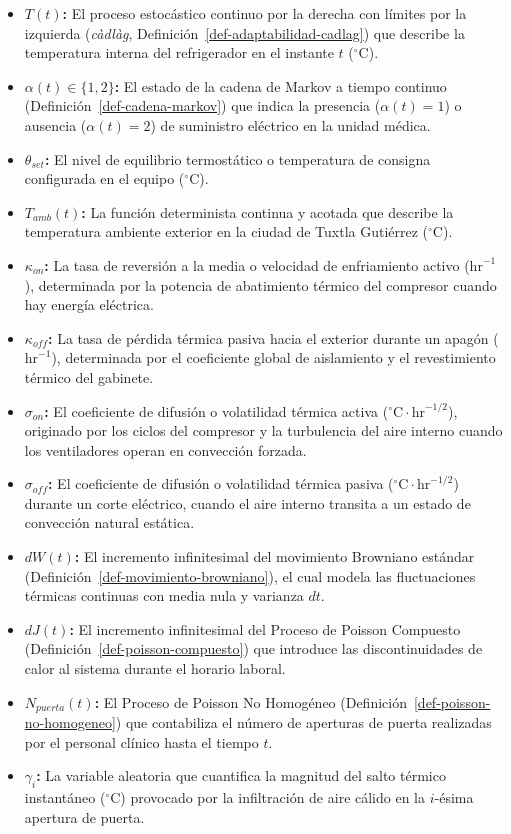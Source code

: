 \documentclass[
  spanish,
  us-letterpaper,
]{scrreprt}
\providecommand{\tightlist}{%
  \setlength{\itemsep}{0pt}\setlength{\parskip}{0pt}}
\numberwithin{equation}{section}
\theoremstyle{plain}
\theoremstyle{plain}
\theoremstyle{plain}
\theoremstyle{definition}
\theoremstyle{remark}
\begin{document}
\begin{itemize}
\tightlist
\item
  \textbf{\(T(t)\):} El proceso estocástico continuo por la derecha con
  límites por la izquierda (\emph{càdlàg},
  Definición~\ref{def-adaptabilidad-cadlag}) que describe la temperatura
  interna del refrigerador en el instante \(t\) (\(^\circ\text{C}\)).
\item
  \textbf{\(\alpha(t) \in \{1, 2\}\):} El estado de la cadena de Markov
  a tiempo continuo (Definición~\ref{def-cadena-markov}) que indica la
  presencia (\(\alpha(t)=1\)) o ausencia (\(\alpha(t)=2\)) de suministro
  eléctrico en la unidad médica.
\item
  \textbf{\(\theta_{set}\):} El nivel de equilibrio termostático o
  temperatura de consigna configurada en el equipo (\(^\circ\text{C}\)).
\item
  \textbf{\(T_{amb}(t)\):} La función determinista continua y acotada
  que describe la temperatura ambiente exterior en la ciudad de Tuxtla
  Gutiérrez (\(^\circ\text{C}\)).
\item
  \textbf{\(\kappa_{on}\):} La tasa de reversión a la media o velocidad
  de enfriamiento activo (\(\text{hr}^{-1}\)), determinada por la
  potencia de abatimiento térmico del compresor cuando hay energía
  eléctrica.
\item
  \textbf{\(\kappa_{off}\):} La tasa de pérdida térmica pasiva hacia el
  exterior durante un apagón (\(\text{hr}^{-1}\)), determinada por el
  coeficiente global de aislamiento y el revestimiento térmico del
  gabinete.
\item
  \textbf{\(\sigma_{on}\):} El coeficiente de difusión o volatilidad
  térmica activa (\(^\circ\text{C}\cdot\text{hr}^{-1/2}\)), originado
  por los ciclos del compresor y la turbulencia del aire interno cuando
  los ventiladores operan en convección forzada.
\item
  \textbf{\(\sigma_{off}\):} El coeficiente de difusión o volatilidad
  térmica pasiva (\(^\circ\text{C}\cdot\text{hr}^{-1/2}\)) durante un
  corte eléctrico, cuando el aire interno transita a un estado de
  convección natural estática.
\item
  \textbf{\(dW(t)\):} El incremento infinitesimal del movimiento
  Browniano estándar (Definición~\ref{def-movimiento-browniano}), el
  cual modela las fluctuaciones térmicas continuas con media nula y
  varianza \(dt\).
\item
  \textbf{\(dJ(t)\):} El incremento infinitesimal del Proceso de Poisson
  Compuesto (Definición~\ref{def-poisson-compuesto}) que introduce las
  discontinuidades de calor al sistema durante el horario laboral.
\item
  \textbf{\(N_{puerta}(t)\):} El Proceso de Poisson No Homogéneo
  (Definición~\ref{def-poisson-no-homogeneo}) que contabiliza el número
  de aperturas de puerta realizadas por el personal clínico hasta el
  tiempo \(t\).
\item
  \textbf{\(\gamma_i\):} La variable aleatoria que cuantifica la
  magnitud del salto térmico instantáneo (\(^\circ\text{C}\)) provocado
  por la infiltración de aire cálido en la \(i\)-ésima apertura de
  puerta.
\end{itemize}
\end{document}
